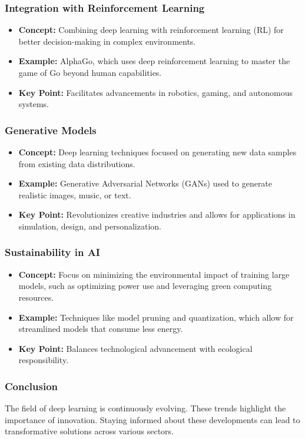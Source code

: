 \documentclass[aspectratio=169]{beamer}
\begin{document}
\begin{frame}[fragile]
    \frametitle{Integration with Reinforcement Learning}
    \begin{itemize}
        \item \textbf{Concept:} Combining deep learning with reinforcement learning (RL) for better decision-making in complex environments.
        \item \textbf{Example:} AlphaGo, which uses deep reinforcement learning to master the game of Go beyond human capabilities.
        \item \textbf{Key Point:} Facilitates advancements in robotics, gaming, and autonomous systems.
    \end{itemize}
\end{frame}

\begin{frame}[fragile]
    \frametitle{Generative Models}
    \begin{itemize}
        \item \textbf{Concept:} Deep learning techniques focused on generating new data samples from existing data distributions.
        \item \textbf{Example:} Generative Adversarial Networks (GANs) used to generate realistic images, music, or text.
        \item \textbf{Key Point:} Revolutionizes creative industries and allows for applications in simulation, design, and personalization.
    \end{itemize}
\end{frame}

\begin{frame}[fragile]
    \frametitle{Sustainability in AI}
    \begin{itemize}
        \item \textbf{Concept:} Focus on minimizing the environmental impact of training large models, such as optimizing power use and leveraging green computing resources.
        \item \textbf{Example:} Techniques like model pruning and quantization, which allow for streamlined models that consume less energy.
        \item \textbf{Key Point:} Balances technological advancement with ecological responsibility.
    \end{itemize}
\end{frame}

\begin{frame}[fragile]
    \frametitle{Conclusion}
    The field of deep learning is continuously evolving. These trends highlight the importance of innovation. 
    Staying informed about these developments can lead to transformative solutions across various sectors.
\end{frame}
\end{document}

